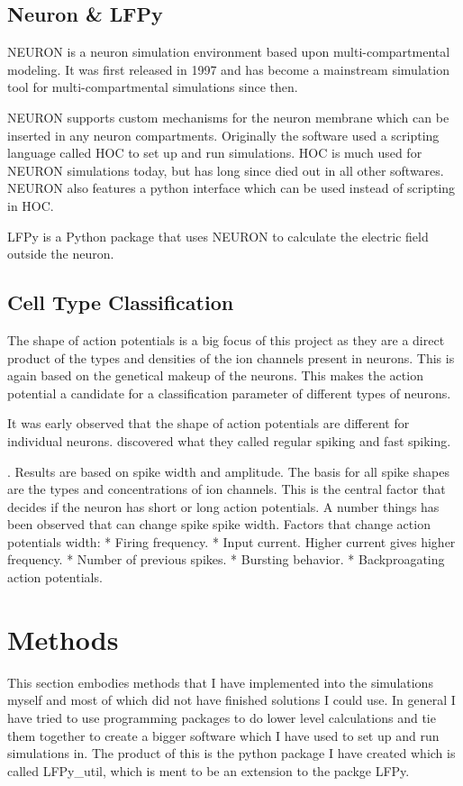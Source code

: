 \documentclass[altfont, fleqn]{uiophd}
\begin{document}
\section{Neuron \& LFPy }
NEURON is a neuron simulation environment 
based upon multi-compartmental modeling. 
It was first released in 1997 and
has become a mainstream simulation tool 
for multi-compartmental simulations since then. 

NEURON supports custom mechanisms for the neuron membrane
which can be inserted in any neuron compartments. 
Originally the software used a scripting language called HOC to
set up and run simulations. 
HOC is much used for NEURON simulations today, but
has long since died out in all
other softwares.
NEURON also features a python interface which can be used instead of
scripting in HOC. 

LFPy is a Python package that uses NEURON to calculate the 
electric field outside the neuron. 
\cite{linden_lfpy:_2013}


\section{Cell Type Classification}

The shape of action potentials is a big focus of this project
as they are a direct product of the types and densities of the ion channels
present in neurons. 
This is again based on the genetical makeup of the neurons. 
This makes the action potential a candidate for a classification parameter
of different types of neurons. 

It was early observed that the shape of action potentials are different for 
individual neurons. \textcite{mountcastle_cortical_1969} discovered what
they called regular spiking and fast spiking.

\cite{mountcastle_cortical_1969}.
Results are based on spike width and amplitude.
The basis for all spike shapes are the types and concentrations of
ion channels.
This is the central factor that decides if the neuron has short or long action potentials.
A number things has been observed that can change spike spike width.
Factors that change action potentials width:
* Firing frequency.
* Input current. Higher current gives higher frequency.
* Number of previous spikes.
* Bursting behavior.
* Backproagating action potentials.

\chapter{Methods}
This section embodies methods that I have implemented into
the simulations myself and most of which did not 
have finished solutions I could use. 
In general I have tried to use programming packages to
do lower level calculations and tie them together to create
a bigger software which I have used to set up and run 
simulations in. 
The product of this is the python package I have created
which is called LFPy\_util, which is ment to be an extension
to the packge LFPy. 
\end{document}

